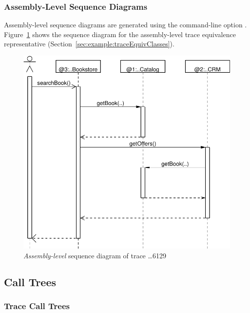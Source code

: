 \pagebreak

\subsubsection{Assembly-Level Sequence Diagrams}\label{sec:example:assemblySeqDiagrams}%

Assembly-level sequence diagrams are generated using the command-line option \OPT{\OPTplotAssemblySequenceDiagrams}. %
Figure~\ref{fig:appendix:traceAnalysisExample:SeqDiagrDepl6129} %
shows the sequence diagram for the assembly-level trace equivalence representative %
(Section~\ref{sec:example:traceEquivClasses}).

\begin{figure}[h]\centering
\includegraphics[scale=0.39]{images/example-plots/assemblySequenceDiagram-6488138950668976129-crop}
\caption{\textit{Assembly-level} sequence diagram of trace \ldots{}6129}
\label{fig:appendix:traceAnalysisExample:SeqDiagrDepl6129}
\end{figure}


\subsection{Call Trees}\label{sec:example:callTrees}%

\subsubsection{Trace Call Trees}\label{sec:example:traceCallTrees}%


